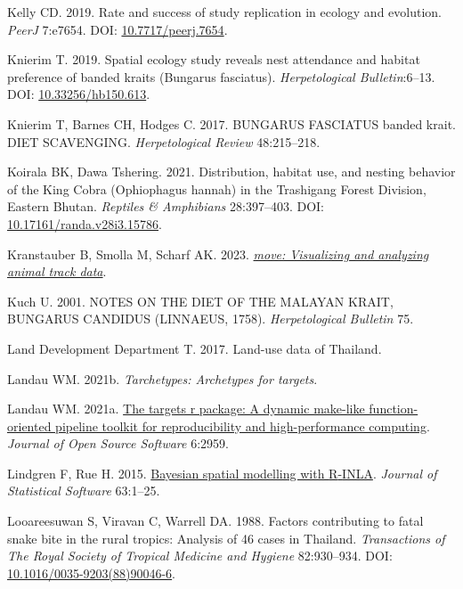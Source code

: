 \documentclass[10pt,a4paper]{article}
\newlength{\cslhangindent}
\newenvironment{CSLReferences}[2] %
 {\begin{list}{}{%
  \setlength{\itemindent}{0pt}
  \setlength{\leftmargin}{0pt}
  \setlength{\parsep}{0pt}
  \ifodd #1
   \setlength{\leftmargin}{\cslhangindent}
   \setlength{\itemindent}{-1\cslhangindent}
  \fi
  \setlength{\itemsep}{#2\baselineskip}}}
 {\end{list}}
\begin{document}
\begin{CSLReferences}{1}{0}
Kelly CD. 2019. Rate and success of study replication in ecology and evolution. \emph{PeerJ} 7:e7654. DOI: \href{https://doi.org/10.7717/peerj.7654}{10.7717/peerj.7654}.

Knierim T. 2019. Spatial ecology study reveals nest attendance and habitat preference of banded kraits ({Bungarus} fasciatus). \emph{Herpetological Bulletin}:6--13. DOI: \href{https://doi.org/10.33256/hb150.613}{10.33256/hb150.613}.

Knierim T, Barnes CH, Hodges C. 2017. BUNGARUS FASCIATUS banded krait. DIET SCAVENGING. \emph{Herpetological Review} 48:215--218.

Koirala BK, Dawa Tshering. 2021. Distribution, habitat use, and nesting behavior of the {King} {Cobra} ({Ophiophagus} hannah) in the {Trashigang} {Forest} {Division}, {Eastern} {Bhutan}. \emph{Reptiles \& Amphibians} 28:397--403. DOI: \href{https://doi.org/10.17161/randa.v28i3.15786}{10.17161/randa.v28i3.15786}.

Kranstauber B, Smolla M, Scharf AK. 2023. \emph{\href{https://CRAN.R-project.org/package=move}{{move}: Visualizing and analyzing animal track data}}.

Kuch U. 2001. {NOTES} {ON} {THE} {DIET} {OF} {THE} {MALAYAN} {KRAIT}, {BUNGARUS} {CANDIDUS} ({LINNAEUS}, 1758). \emph{Herpetological Bulletin} 75.

Land Development Department T. 2017. Land-use data of {Thailand}.

Landau WM. 2021b. \emph{Tarchetypes: Archetypes for targets}.

Landau WM. 2021a. \href{https://doi.org/10.21105/joss.02959}{The targets r package: A dynamic make-like function-oriented pipeline toolkit for reproducibility and high-performance computing}. \emph{Journal of Open Source Software} 6:2959.

Lindgren F, Rue H. 2015. \href{http://www.jstatsoft.org/v63/i19/}{Bayesian spatial modelling with {R}-{INLA}}. \emph{Journal of Statistical Software} 63:1--25.

Looareesuwan S, Viravan C, Warrell DA. 1988. Factors contributing to fatal snake bite in the rural tropics: Analysis of 46 cases in {Thailand}. \emph{Transactions of The Royal Society of Tropical Medicine and Hygiene} 82:930--934. DOI: \href{https://doi.org/10.1016/0035-9203(88)90046-6}{10.1016/0035-9203(88)90046-6}.


\end{CSLReferences}
\end{document}
